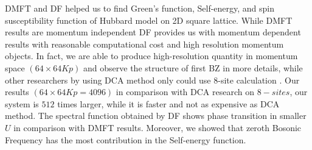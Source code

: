 DMFT and DF helped us to find Green's function, Self-energy, and spin susceptibility function of  Hubbard model on 2D square lattice. While DMFT results are momentum independent DF provides us with momentum dependent results with reasonable computational cost and high resolution momentum objects. In fact, we are able to produce high-resolution quantity in momentum space $(64 \times64 Kp)$ and observe the structure of first BZ in more details, while other researchers by using DCA method only could use 8-site calculation \cite{Toschi}. Our results $(64\times 64 Kp= 4096)$ in comparison with DCA research on $8-sites$, our system is $512$ times larger, while it is faster and not as expensive as DCA method. The spectral function obtained by DF shows phase transition in smaller $U$ in comparison with DMFT results. Moreover, we showed that zeroth Bosonic Frequency has the most contribution in the Self-energy function.